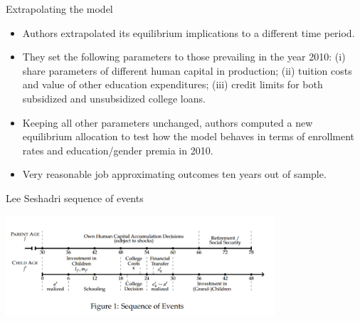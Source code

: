 \documentclass{beamer}
\begin{document}
\begin{frame}[label=Extrapolate]{Extrapolating the model}
\hyperlink{Return7}{}

\begin{itemize}
\item Authors extrapolated its equilibrium implications to a different time period. 
\item They set the following parameters to those prevailing
in the year 2010: (i) share parameters of different human capital in production; (ii) tuition costs and value of other education expenditures; (iii) credit limits for both subsidized and unsubsidized college loans.
\item Keeping all other parameters unchanged, authors computed a new equilibrium allocation to test how the model behaves in terms of enrollment rates and education/gender premia in 2010.
\item Very reasonable job approximating outcomes ten years out of sample.
\end{itemize}
\end{frame}

\begin{frame}[label=lstime]{Lee Seshadri sequence of events}
\hyperlink{ReturnLS1}{}
\begin{center}
\includegraphics[width=100mm]{leeseshadri3.PNG}\\
\end{center}
\end{frame}

\end{document}
